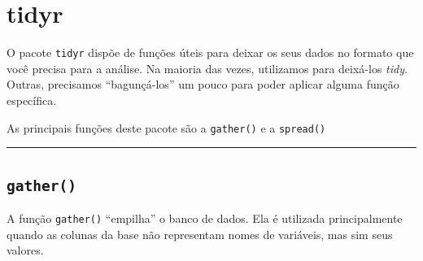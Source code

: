 \documentclass[]{book}
\begin{document}
\hypertarget{tidyr}{%
\section{tidyr}\label{tidyr}}

O pacote \texttt{tidyr} dispõe de funções úteis para deixar os seus dados no formato que você precisa para a análise. Na maioria das vezes, utilizamos para deixá-los \emph{tidy}. Outras, precisamos ``bagunçá-los'' um pouco para poder aplicar alguma função específica.

As principais funções deste pacote são a \texttt{gather()} e a \texttt{spread()}

\begin{center}\rule{0.5\linewidth}{\linethickness}\end{center}

\hypertarget{gather}{%
\subsection{\texorpdfstring{\texttt{gather()}}{gather()}}\label{gather}}

A função \texttt{gather()} ``empilha'' o banco de dados. Ela é utilizada principalmente quando as colunas da base não representam nomes de variáveis, mas sim seus valores.
\end{document}
